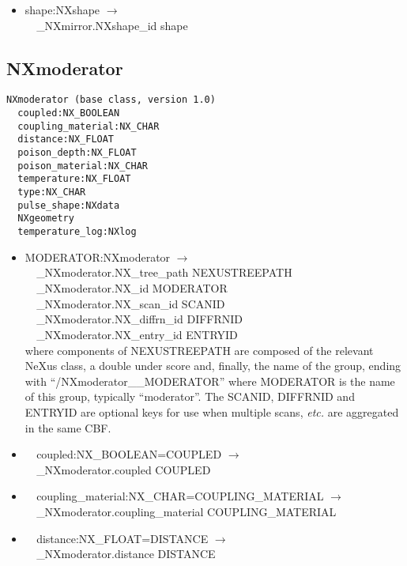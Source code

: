 \documentclass[11pt]{article}
\begin{document}
{{\begin{itemize}
\item{shape:NXshape $\rightarrow$\\
\verb|  |\_NXmirror.NXshape\_id shape}
\end{itemize}
\subsection{NXmoderator}

\begin{verbatim}
NXmoderator (base class, version 1.0)
  coupled:NX_BOOLEAN
  coupling_material:NX_CHAR
  distance:NX_FLOAT
  poison_depth:NX_FLOAT
  poison_material:NX_CHAR
  temperature:NX_FLOAT
  type:NX_CHAR
  pulse_shape:NXdata
  NXgeometry
  temperature_log:NXlog
\end{verbatim}

\begin{itemize}

\item{MODERATOR:NXmoderator $\rightarrow$\\
\verb|  |\_NXmoderator.NX\_tree\_path    NEXUSTREEPATH \\
\verb|  |\_NXmoderator.NX\_id            MODERATOR\\
\verb|  |\_NXmoderator.NX\_scan\_id      SCANID \\
\verb|  |\_NXmoderator.NX\_diffrn\_id    DIFFRNID \\
\verb|  |\_NXmoderator.NX\_entry\_id     ENTRYID \\
where components of NEXUSTREEPATH are composed of the
relevant NeXus class, a double under score and, finally, the
name of the group, ending with ``/NXmoderator\_\_MODERATOR''
where MODERATOR is the name of this group, typically ``moderator''.
The SCANID, DIFFRNID and ENTRYID are optional keys for use
when multiple scans, {\it etc.} are aggregated in the same CBF.}

\item{\verb|  |coupled:NX\_BOOLEAN=COUPLED $\rightarrow$\\
\verb|  |\_NXmoderator.coupled COUPLED}

\item{\verb|  |coupling\_material:NX\_CHAR=COUPLING\_MATERIAL $\rightarrow$\\
\verb|  |\_NXmoderator.coupling\_material COUPLING\_MATERIAL}

\item{\verb|  |distance:NX\_FLOAT=DISTANCE $\rightarrow$\\
\verb|  |\_NXmoderator.distance DISTANCE}


\end{itemize}}}
\end{document}
